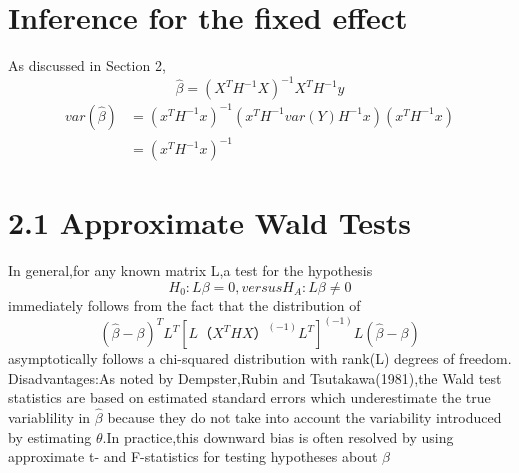 \documentclass[a4paper,11pt]{article}
\begin{document}
\section{Inference for the fixed effect}

As discussed in Section 2,
\begin{equation}\label{eq:4} 
         \widehat{\beta} = (X^T H^{-1} X)^{-1} X^T H^{-1} y
\end{equation}
\begin{equation}\label{eq:7} 
  \begin{split}
    var(\widehat{\beta}) &= (x^T H^{-1} x)^{-1}(x^T H^{-1} var(Y) H^{-1} x)(x^T H^{-1} x)\\
                         &=(x^T H^{-1} x)^{-1}
  \end{split}
\end{equation}
\section{2.1 Approximate Wald Tests}
In general,for any known matrix L,a test for the hypothesis
\begin{equation}\label{eq:8} 
         H_0 : L\beta = 0, versus H_A: L\beta \neq 0
\end{equation}
immediately follows from the fact that the distribution of 
\begin{equation}\label{eq:8}
(\widehat{\beta}-\beta)^T L^T [L（X^T H X）^(-1) L^T]^(-1) L(\widehat{\beta}-\beta)
\end{equation}
asymptotically follows a chi-squared distribution with rank(L) degrees of freedom.
Disadvantages:As noted by Dempster,Rubin and Tsutakawa(1981),the Wald test statistics are based on estimated standard errors which underestimate the true variablility in $\widehat{\beta}$ because they do not take into account the variability introduced by estimating $\theta$.In practice,this downward bias is often resolved by using approximate t- and F-statistics for testing hypotheses about $\beta$
\end{document}
